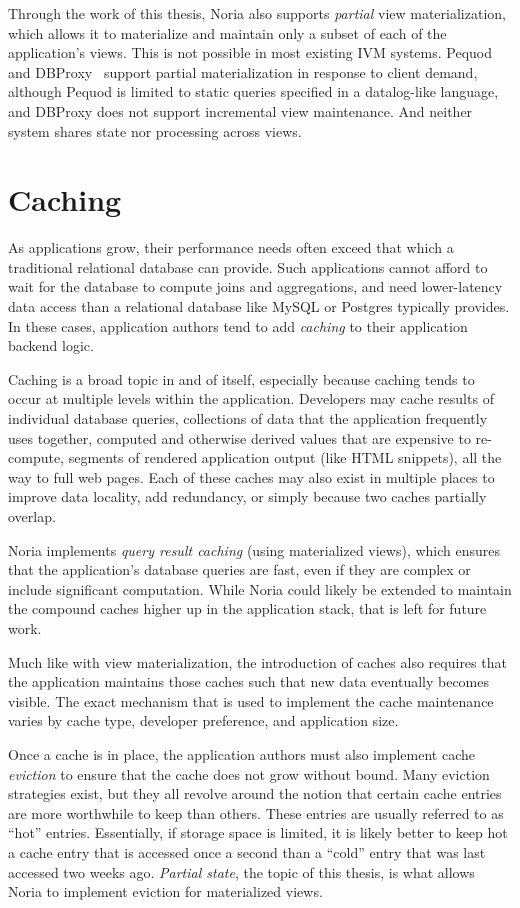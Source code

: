 Through the work of this thesis, Noria also supports \emph{partial} view
materialization, which allows it to materialize and maintain only a subset of
each of the application's views. This is not possible in most existing IVM
systems. Pequod~\cite{pequod} and DBProxy~\cite{dbproxy} support partial
materialization in response to client demand, although Pequod is limited to
static queries specified in a datalog-like language, and DBProxy does not
support incremental view maintenance. And neither system shares state nor
processing across views.

\section{Caching}

As applications grow, their performance needs often exceed that which a
traditional relational database can provide. Such applications cannot afford to
wait for the database to compute joins and aggregations, and need lower-latency
data access than a relational database like MySQL or Postgres typically
provides. In these cases, application authors tend to add \textit{caching} to
their application backend logic.

Caching is a broad topic in and of itself, especially because caching tends to
occur at multiple levels within the application. Developers may cache results of
individual database queries, collections of data that the application frequently
uses together, computed and otherwise derived values that are expensive to
re-compute, segments of rendered application output (like HTML snippets), all
the way to full web pages. Each of these caches may also exist in multiple
places to improve data locality, add redundancy, or simply because two caches
partially overlap.

Noria implements \textit{query result caching} (using materialized views), which
ensures that the application's database queries are fast, even if they are
complex or include significant computation. While Noria could likely be extended
to maintain the compound caches higher up in the application stack, that is left
for future work.

Much like with view materialization, the introduction of caches also requires
that the application maintains those caches such that new data eventually
becomes visible. The exact mechanism that is used to implement the cache
maintenance varies by cache type, developer preference, and application size.

Once a cache is in place, the application authors must also implement cache
\textit{eviction} to ensure that the cache does not grow without bound. Many
eviction strategies exist, but they all revolve around the notion that certain
cache entries are more worthwhile to keep than others. These entries are usually
referred to as ``hot'' entries. Essentially, if storage space is limited, it is
likely better to keep hot a cache entry that is accessed once a second than a
``cold'' entry that was last accessed two weeks ago. \textit{Partial state}, the
topic of this thesis, is what allows Noria to implement eviction for
materialized views.

